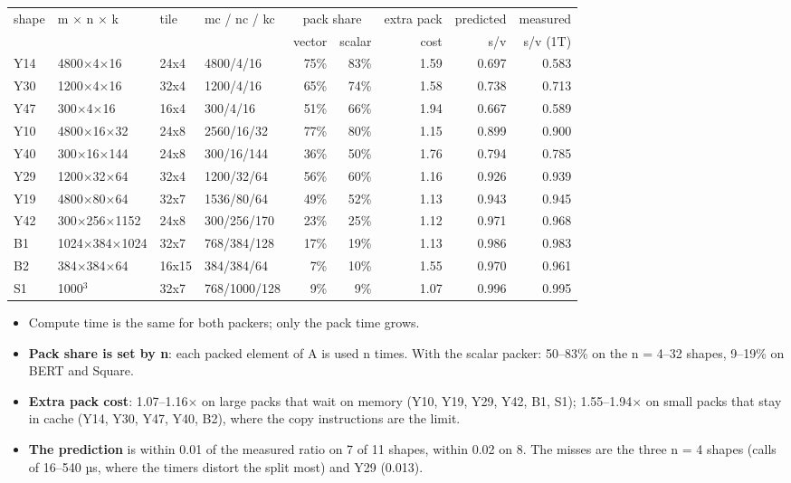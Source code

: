 \begin{center}\small
\begin{tabular}{@{}l l l l rr r rr@{}}
\toprule
shape & m $\times$ n $\times$ k & tile & mc / nc / kc & \multicolumn{2}{c}{pack share} & extra pack & predicted & measured \\
 & & & & vector & scalar & cost & s/v & s/v (1T) \\
\midrule
Y14 & 4800$\times$4$\times$16 & 24x4 & 4800/4/16 & 75\% & 83\% & 1.59 & 0.697 & 0.583 \\
Y30 & 1200$\times$4$\times$16 & 32x4 & 1200/4/16 & 65\% & 74\% & 1.58 & 0.738 & 0.713 \\
Y47 & 300$\times$4$\times$16 & 16x4 & 300/4/16 & 51\% & 66\% & 1.94 & 0.667 & 0.589 \\
Y10 & 4800$\times$16$\times$32 & 24x8 & 2560/16/32 & 77\% & 80\% & 1.15 & 0.899 & 0.900 \\
Y40 & 300$\times$16$\times$144 & 24x8 & 300/16/144 & 36\% & 50\% & 1.76 & 0.794 & 0.785 \\
Y29 & 1200$\times$32$\times$64 & 32x4 & 1200/32/64 & 56\% & 60\% & 1.16 & 0.926 & 0.939 \\
Y19 & 4800$\times$80$\times$64 & 32x7 & 1536/80/64 & 49\% & 52\% & 1.13 & 0.943 & 0.945 \\
Y42 & 300$\times$256$\times$1152 & 24x8 & 300/256/170 & 23\% & 25\% & 1.12 & 0.971 & 0.968 \\
B1 & 1024$\times$384$\times$1024 & 32x7 & 768/384/128 & 17\% & 19\% & 1.13 & 0.986 & 0.983 \\
B2 & 384$\times$384$\times$64 & 16x15 & 384/384/64 & 7\% & 10\% & 1.55 & 0.970 & 0.961 \\
S1 & 1000$^3$ & 32x7 & 768/1000/128 & 9\% & 9\% & 1.07 & 0.996 & 0.995 \\
\bottomrule
\end{tabular}
\end{center}
\begin{itemize}\setlength\itemsep{1pt}
\item Compute time is the same for both packers; only the pack time grows.
\item \textbf{Pack share is set by n}: each packed element of A is used n times. With the scalar packer: 50--83\% on the n = 4--32 shapes, 9--19\% on BERT and Square.
\item \textbf{Extra pack cost}: 1.07--1.16$\times$ on large packs that wait on memory (Y10, Y19, Y29, Y42, B1, S1); 1.55--1.94$\times$ on small packs that stay in cache (Y14, Y30, Y47, Y40, B2), where the copy instructions are the limit.
\item \textbf{The prediction} is within 0.01 of the measured ratio on 7 of 11 shapes, within 0.02 on 8. The misses are the three n = 4 shapes (calls of 16--540 µs, where the timers distort the split most) and Y29 (0.013).
\end{itemize}

